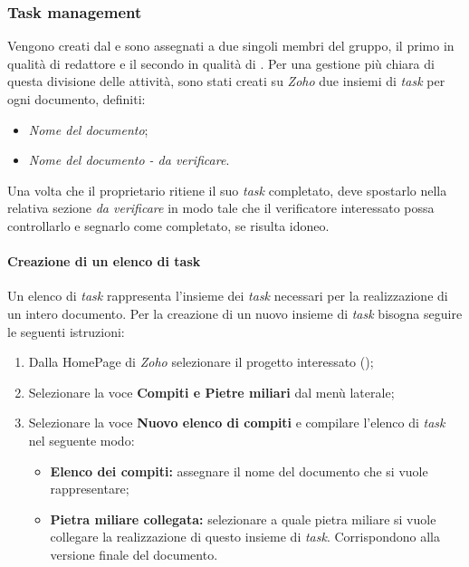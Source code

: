 \subsubsection{Task management}
Vengono creati dal \textit{\RdP} e sono assegnati a due singoli membri del gruppo,
il primo in qualità di redattore e il secondo in qualità di \textit{\Ver}.
Per una gestione più chiara di questa divisione delle attività, sono stati creati su \textit{Zoho}
due insiemi di \textit{task} per ogni documento, definiti:
\begin{itemize}
  \item \textit{Nome del documento};
  \item \textit{Nome del documento - da verificare}.
\end{itemize}
Una volta che il proprietario ritiene il suo \textit{task} completato, deve spostarlo
nella relativa sezione \textit{da verificare} in modo tale che il verificatore
interessato possa controllarlo e segnarlo come completato, se risulta idoneo.

\paragraph{Creazione di un elenco di task}
Un elenco di \textit{task} rappresenta l'insieme dei \textit{task} necessari per la realizzazione di un intero documento.
Per la creazione di un nuovo insieme di \textit{task} bisogna seguire le seguenti istruzioni:
\begin{enumerate}
   \item Dalla HomePage di \textit{Zoho} selezionare il progetto interessato (\progetto);
  \item Selezionare la voce \textbf{Compiti e Pietre miliari} dal menù laterale;
   \item Selezionare la voce \textbf{Nuovo elenco di compiti} e compilare l'elenco di \textit{task} nel
  seguente modo:
  \begin{itemize}
    \item \textbf{Elenco dei compiti:} assegnare il nome del documento che si
    vuole rappresentare;
    \item \textbf{Pietra miliare collegata:} selezionare a quale pietra miliare si
    vuole collegare la realizzazione di questo insieme di \textit{task}. Corrispondono alla
    versione finale del documento.
  \end{itemize}
\end{enumerate}
